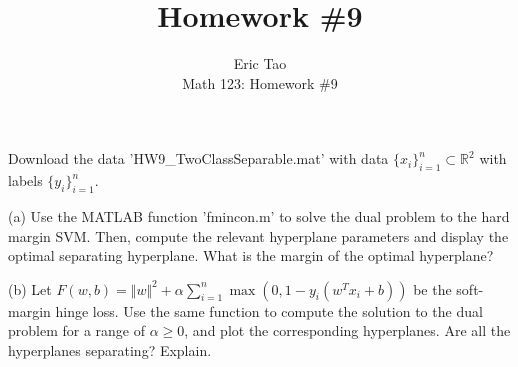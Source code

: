 \documentclass[10pt]{article}
\newenvironment{problem}[2][]{\begin{trivlist}
\item[\hskip \labelsep {\bfseries #1}\hskip \labelsep {\bfseries #2.}]}{\end{trivlist}}
\begin{document}
 
\title{Homework \#9}
\author{Eric Tao\\
Math 123: Homework \#9}
\maketitle

\begin{problem}{Question 1}

Download the data 'HW9\_TwoClassSeparable.mat' with data $\{ x_i \}_{i=1}^n \subset \mathbb{R}^2$ with labels $\{  y_i \}_{i=1}^n$.

(a) Use the MATLAB function 'fmincon.m' to solve the dual problem to the hard margin SVM. Then, compute the relevant hyperplane parameters and display the optimal separating hyperplane. What is the margin of the optimal hyperplane?

(b) Let $F(w,b) = \Vert w \Vert^2 + \alpha \sum_{i=1}^n \max(0,1 - y_i(w^T x_i + b))$ be the soft-margin hinge loss. Use the same function to compute the solution to the dual problem for a range of $\alpha \geq 0$, and plot the corresponding hyperplanes. Are all the hyperplanes separating? Explain.

\end{problem}
\end{document}
